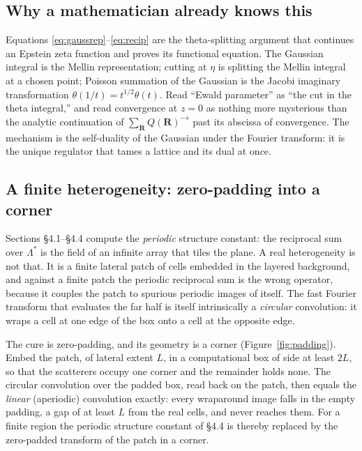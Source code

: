 \documentclass[11pt,a4paper]{article}
\newcommand{\vR}{\mathbf{R}}
\newcommand{\dLat}{\Lambda^{\ast}}
\begin{document}
\subsection{Why a mathematician already knows this}

Equations \eqref{eq:gaussrep}--\eqref{eq:recip} are the theta-splitting argument that
continues an Epstein zeta function and proves its functional equation. The Gaussian integral
is the Mellin representation; cutting at $\eta$ is splitting the Mellin integral at a chosen
point; Poisson summation of the Gaussian is the Jacobi imaginary transformation
$\theta(1/t)=t^{1/2}\theta(t)$. Read ``Ewald parameter'' as ``the cut in the theta integral,''
and read convergence at $z=0$ as nothing more mysterious than the analytic continuation of
$\sum_{\vR}Q(\vR)^{-s}$ past its abscissa of convergence. The mechanism is the self-duality
of the Gaussian under the Fourier transform: it is the unique regulator that tames a lattice
and its dual at once.

\subsection{A finite heterogeneity: zero-padding into a corner}

Sections \S4.1--\S4.4 compute the \emph{periodic} structure constant: the reciprocal sum over
$\dLat$ is the field of an infinite array that tiles the plane. A real heterogeneity is not
that. It is a finite lateral patch of cells embedded in the layered background, and against a
finite patch the periodic reciprocal sum is the wrong operator, because it couples the patch to
spurious periodic images of itself. The fast Fourier transform that evaluates the far half is
itself intrinsically a \emph{circular} convolution: it wraps a cell at one edge of the box onto
a cell at the opposite edge.

The cure is zero-padding, and its geometry is a corner (Figure~\ref{fig:padding}). Embed the
patch, of lateral extent $L$, in a computational box of side at least $2L$, so that the
scatterers occupy one corner and the remainder holds none. The circular convolution over the
padded box, read back on the patch, then equals the \emph{linear} (aperiodic) convolution
exactly: every wraparound image falls in the empty padding, a gap of at least $L$ from the real
cells, and never reaches them. For a finite region the periodic structure constant of \S4.4 is
thereby replaced by the zero-padded transform of the patch in a corner.
\end{document}

